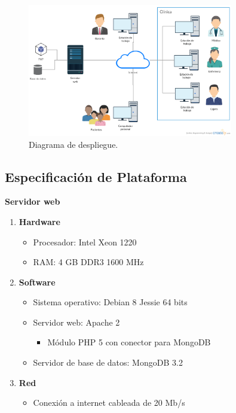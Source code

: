 	\begin{figure}[htbp!]
		\centering
			\includegraphics[width=0.8\textwidth]{images/Diagrama_despliegue}
		\caption{Diagrama de despliegue.}
	\end{figure}


\subsection{Especificación de Plataforma}


\textbf{Servidor web}
\begin{enumerate}
\item \textbf{Hardware}
\begin{itemize}
\item Procesador: Intel Xeon 1220
\item RAM: 4 GB DDR3 1600 MHz
\end{itemize}
\item \textbf{Software}
\begin{itemize}
\item Sistema operativo: Debian 8 Jessie 64 bits
\item Servidor web: Apache 2
\begin{itemize}
\item Módulo PHP 5 con conector para MongoDB
\end{itemize}
\item Servidor de base de datos: MongoDB 3.2
\end{itemize}
\item \textbf{Red}
\begin{itemize}
\item Conexión a internet cableada de 20 Mb/s
\end{itemize}
\end{enumerate}

